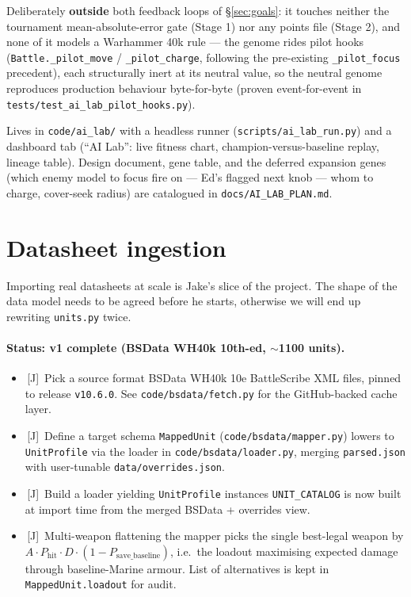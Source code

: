 \documentclass[11pt,a4paper]{article}
\newcommand{\jake}{\textcolor{jakeorange}{\textsf{[J]}}}
\newcommand{\done}{\ding{51}\,}     %
\begin{document}
Deliberately \textbf{outside} both feedback loops of
\S\ref{sec:goals}: it touches neither the tournament mean-absolute-error
gate (Stage 1) nor any points file (Stage 2), and none of it models a
Warhammer 40k rule --- the genome rides pilot hooks
(\texttt{Battle.\_pilot\_move} / \texttt{\_pilot\_charge}, following the
pre-existing \texttt{\_pilot\_focus} precedent), each structurally inert at
its neutral value, so the neutral genome reproduces production behaviour
byte-for-byte (proven event-for-event in
\texttt{tests/test\_ai\_lab\_pilot\_hooks.py}).

Lives in \texttt{code/ai\_lab/} with a headless runner
(\texttt{scripts/ai\_lab\_run.py}) and a dashboard tab (``AI Lab'': live
fitness chart, champion-versus-baseline replay, lineage table). Design
document, gene table, and the deferred expansion genes (which enemy model
to focus fire on --- Ed's flagged next knob --- whom to charge, cover-seek
radius) are catalogued in \texttt{docs/AI\_LAB\_PLAN.md}.

\section{Datasheet ingestion}

Importing real datasheets at scale is Jake's slice of the project. The
shape of the data model needs to be agreed before he starts, otherwise
we will end up rewriting \texttt{units.py} twice.

\paragraph{Status: v1 complete (BSData WH40k 10th-ed, $\sim$1100 units).}

\begin{itemize}[label={},leftmargin=*,itemsep=2pt]
  \item \done \jake\ Pick a source format \textemdash{} BSData WH40k 10e
    BattleScribe XML files, pinned to release \texttt{v10.6.0}. See
    \texttt{code/bsdata/fetch.py} for the GitHub-backed cache layer.
  \item \done \jake\ Define a target schema \textemdash{}
    \texttt{MappedUnit} (\texttt{code/bsdata/mapper.py}) lowers to
    \texttt{UnitProfile} via the loader in
    \texttt{code/bsdata/loader.py}, merging \texttt{parsed.json} with
    user-tunable \texttt{data/overrides.json}.
  \item \done \jake\ Build a loader yielding \texttt{UnitProfile}
    instances \textemdash{} \texttt{UNIT\_CATALOG} is now built at
    import time from the merged BSData + overrides view.
  \item \done \jake\ Multi-weapon flattening \textemdash{} the mapper
    picks the single best-legal weapon by
    $A \cdot P_{\text{hit}} \cdot D \cdot (1 - P_{\text{save\_baseline}})$,
    i.e.\ the loadout maximising expected damage through baseline-Marine
    armour. List of alternatives is kept in
    \texttt{MappedUnit.loadout} for audit.
\end{itemize}
\end{document}
